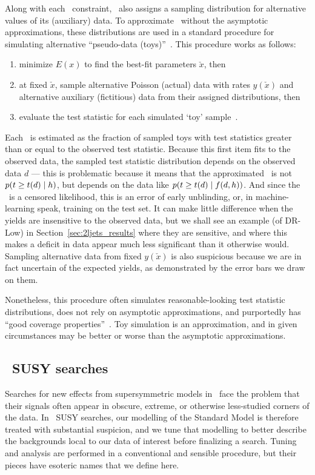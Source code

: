 Along with each \heplikelihood\ constraint, \histfactory\ also assigns a
sampling distribution for alternative values of its (auxiliary) data.
To approximate \pvalues\ without the asymptotic approximations,
these distributions are used in a standard procedure for simulating
alternative ``pseudo-data (toys)''~\cite{cern2011procedure}.
This procedure works as follows:
\begin{enumerate}
\item minimize $E(x)$ to find the best-fit parameters $\check{x}$, then
\item at fixed $\check{x}$, sample alternative Poisson (actual) data with rates
$y(\check{x})$ and alternative auxiliary (fictitious) data from their assigned
distributions, then
\item evaluate the test statistic for each simulated `toy'
sample~\cite{cern2011procedure}.
\end{enumerate}
Each \pvalue\ is estimated as the fraction of sampled toys with test statistics
greater than or equal to the observed test statistic.
Because this first item fits to the observed data, the sampled test statistic
distribution depends on the observed data $d$ ---
this is problematic because it means that the approximated \pvalue\ is not
$p(t \geq t(d) \mid h)$, but depends on the data like
$p(t \geq t(d) \mid f(d, h))$.
And since the \pvalue\ is a censored likelihood, this is an error of early
unblinding, or, in machine-learning speak, training on the test set.
It can make little difference when the yields are insensitive to the observed
data, but we shall see an example (of DR-Low) in
Section~\ref{sec:2ljets_results} where they are sensitive, and where
this makes a deficit in data appear much less significant than it  otherwise
would.
Sampling alternative data from fixed $y(\check{x})$ is also suspicious because
we are in fact uncertain of the expected yields,
as demonstrated by the error bars we draw on them.

Nonetheless, this procedure often simulates reasonable-looking test statistic
distributions, does not rely on asymptotic approximations, and purportedly
has ``good coverage properties''~\cite{
cern2011procedure,
Cranmer2006Statistical
}.
Toy simulation is an approximation, and in given circumstances may be better or
worse than the asymptotic approximations.


\subsection{\atlas\ SUSY searches}
\label{sec:searches_searches}
Searches for new effects from supersymmetric models in \atlas\ face the problem
that their signals often appear in obscure, extreme, or otherwise less-studied
corners of the data.
In \atlas\ SUSY searches, our modelling of the  Standard Model is therefore
treated with substantial suspicion, and we tune that modelling to better
describe the backgrounds local to our data of interest before finalizing a
search.
Tuning and analysis are performed in a conventional and sensible procedure,
but their pieces have esoteric names that we define here.

